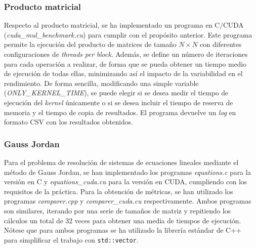 \subsubsection{Producto matricial}
Respecto al producto matricial, se ha implementado un programa en C/CUDA (\textit{cuda\_mul\_benchmark.cu}) para cumplir con el 
propósito anterior. Este programa permite la ejecución del producto de matrices de tamaño $N \times N$ con diferentes configuraciones
de \textit{threads per block}. Además, se define un número de iteraciones para cada operación a realizar, de forma que se pueda 
obtener un tiempo medio de ejecución de todas ellas, minimizando así el impacto de la variabilidad en el rendimiento.
De forma sencilla, modificando una simple variable (\textit{ONLY\_KERNEL\_TIME}), se puede elegir si se desea medir el tiempo 
de ejecución del \textit{kernel} únicamente o si se desea incluir el tiempo de reserva de memoria y el tiempo de copia de resultados.
El programa devuelve un \textit{log} en formato CSV con los resultados obtenidos.

\subsubsection{Gauss Jordan}
Para el problema de resolución de sistemas de ecuaciones lineales mediante el método de Gauss Jordan,
se han implementado los programas \textit{equations.c} para la versión en C y
\textit{equations\_cuda.cu} para la versión en CUDA,
cumpliendo con los requisitos de la práctica.
Para la obtención de métricas, se han utilizado los programas
\textit{comparer.cpp} y \textit{comparer\_cuda.cu} respectivamente.
Ambos programas son similares, iterando por una serie de tamaños de matriz y
repitiendo los cálculos un total de 32 veces para obtener
una media de tiempos de ejecución.
Nótese que para ambos programas se ha utilizado la librería estándar de C++
para simplificar el trabajo con \texttt{std::vector}.

